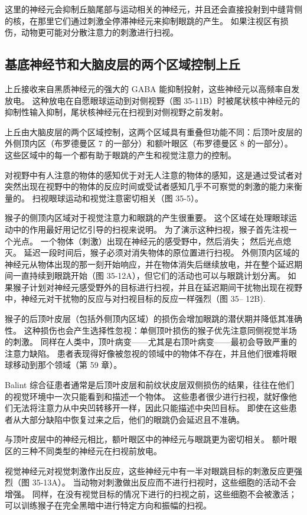 这里的神经元会抑制丘脑尾部与运动相关的神经元，并且还会直接投射到中缝背侧的核，在那里它们通过刺激全停滞神经元来抑制眼跳的产生。 如果注视区有损伤，动物更可能对分散注意力的刺激进行扫视。

\subsection{基底神经节和大脑皮层的两个区域控制上丘}
上丘接收来自黑质神经元的强大的 GABA 能抑制投射，这些神经元以高频率自发放电。 这种放电在自愿眼球运动到对侧视野（图 35-11B）时被尾状核中神经元的抑制性输入抑制，尾状核神经元在扫视到对侧视野之前发射。

上丘由大脑皮层的两个区域控制，这两个区域具有重叠但功能不同：后顶叶皮层的外侧顶内区（布罗德曼区 7 的一部分）和额叶眼区（布罗德曼区 8 的一部分）。 这些区域中的每一个都有助于眼跳的产生和视觉注意力的控制。

对视野中有人注意的物体的感知优于对无人注意的物体的感知，这是通过受试者对突然出现在视野中的物体的反应时间或受试者感知几乎不可察觉的刺激的能力来衡量的。 扫视眼球运动和视觉注意密切相关（图 35-5）。

猴子的侧顶内区域对于视觉注意力和眼跳的产生很重要。 这个区域在处理眼球运动中的作用最好用记忆引导的扫视来说明。 为了演示这种扫视，猴子首先注视一个光点。 一个物体（刺激）出现在神经元的感受野中，然后消失； 然后光点熄灭。 延迟一段时间后，猴子必须对消失物体的原位置进行扫视。 外侧顶内区域的神经元从物体出现的那一刻开始响应，并在物体消失后继续放电，并在整个延迟期间一直持续到眼跳开始（图 35-12A），但它们的活动也可以与眼跳计划分离。 如果猴子计划对神经元感受野外的目标进行扫视，并且在延迟期间干扰物出现在视野中，神经元对干扰物的反应与对扫视目标的反应一样强烈（图 35– 12B).

猴子的后顶叶皮层（包括外侧顶内区域）的损伤会增加眼跳的潜伏期并降低其准确性。 这种损伤也会产生选择性忽视：单侧顶叶损伤的猴子优先注意同侧视觉半场的刺激。 同样在人类中，顶叶病变——尤其是右顶叶病变——最初会导致严重的注意力缺陷。 患者表现得好像被忽视的领域中的物体不存在，并且他们很难将眼球移动到那个领域（第 59 章）。

Balint 综合征患者通常是后顶叶皮层和前纹状皮层双侧损伤的结果，往往在他们的视觉环境中一次只能看到和描述一个物体。 这些患者很少进行扫视，就好像他们无法将注意力从中央凹转移开一样，因此只能描述中央凹目标。 即使在这些患者从大部分缺陷中恢复过来之后，他们的眼跳仍会延迟且不准确。

与顶叶皮层中的神经元相比，额叶眼区中的神经元与眼跳更为密切相关。 额叶眼区的三种不同类型的神经元在扫视前放电。

视觉神经元对视觉刺激作出反应，这些神经元中有一半对眼跳目标的刺激反应更强烈（图 35-13A）。 当动物对刺激做出反应而不进行扫视时，这些细胞的活动不会增强。 同样，在没有视觉目标的情况下进行的扫视之前，这些细胞不会被激活； 可以训练猴子在完全黑暗中进行特定方向和振幅的扫视。


